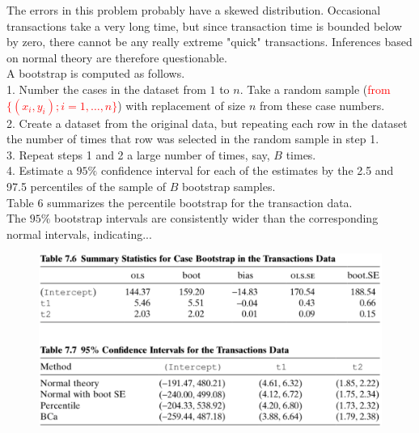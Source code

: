 \documentclass[14pt]{extarticle}
\begin{document}
The errors in this problem probably have a skewed distribution. Occasional transactions take a very long time, but since transaction time is bounded below by zero, there cannot be any really extreme "quick" transactions. Inferences based on normal theory are therefore questionable.\\
A bootstrap is computed as follows.\\
1. Number the cases in the dataset from \( 1 \) to \( n \). Take a random sample (\textcolor{red}{from $\{(x_i, y_i) ; i = 1, \ldots, n\}
$}) with replacement of size \( n \) from these case numbers.\\
2. Create a dataset from the original data, but repeating each row in the dataset the number of times that row was selected in the random sample in step 1.\\
3. Repeat steps 1 and 2 a large number of times, say, \( B \) times.\\
4. Estimate a \( 95\% \) confidence interval for each of the estimates by the 2.5 and 97.5 percentiles of the sample of \( B \) bootstrap samples.\\
Table 6 summarizes the percentile bootstrap for the transaction data.\\
The \( 95\% \) bootstrap intervals are consistently wider than the corresponding normal intervals, indicating...
\begin{figure}[H]
    \centering
    \includegraphics[width=1\textwidth]{fig17.png}
\end{figure} 
\end{document}
